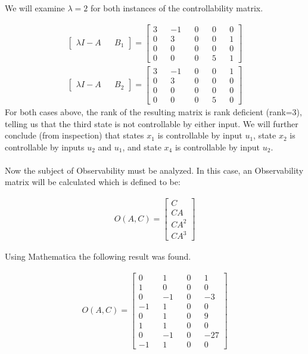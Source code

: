 \documentclass[paper=a4,margin, fontsize=11pt]{scrartcl} %
\numberwithin{equation}{section} %
\numberwithin{figure}{section} %
\numberwithin{table}{section} %
\begin{document}
We will examine $\lambda=2$ for both instances of the controllability matrix.

\begin{align*}
\begin{bmatrix}\lambda I-A && B_1\end{bmatrix}=\begin{bmatrix} 3 && -1 && 0 && 0 && 0\\0 && 3 && 0 && 0 && 1\\0 && 0 && 0 && 0 && 0\\0 && 0 && 0 && 5 && 1\end{bmatrix}
\\
\begin{bmatrix}\lambda I-A && B_2\end{bmatrix}=\begin{bmatrix} 3 && -1 && 0 && 0 && 1\\0 && 3 && 0 && 0 && 0\\0 && 0 && 0 && 0 && 0\\0 && 0 && 0 && 5 && 0\end{bmatrix}
\end{align*}
For both cases above, the rank of the resulting matrix is rank deficient (rank=3), telling us that the third state is not controllable by either input.  We will further conclude (from inspection) that states $x_1$ is controllable by input $u_1$, state $x_2$ is controllable by inputs $u_2$ and $u_1$, and state $x_4$ is controllable by input $u_2$.\\
\\
Now the subject of Observability must be analyzed.  In this case, an Observability matrix will be calculated which is defined to be:

\begin{align*}
O(A,C)=\begin{bmatrix}C\\CA\\CA^2\\CA^3\end{bmatrix}
\end{align*}

Using Mathematica the following result was found.

\begin{align*}
O(A,C)=\begin{bmatrix}0 && 1 && 0 && 1\\1 && 0 && 0 && 0\\0 && -1 && 0 && -3\\-1 && 1 && 0 && 0\\0 && 1 && 0 && 9\\1 && 1 && 0 && 0\\0 && -1 && 0 && -27\\-1 && 1 && 0 && 0\end{bmatrix}
\end{align*}
\end{document}
